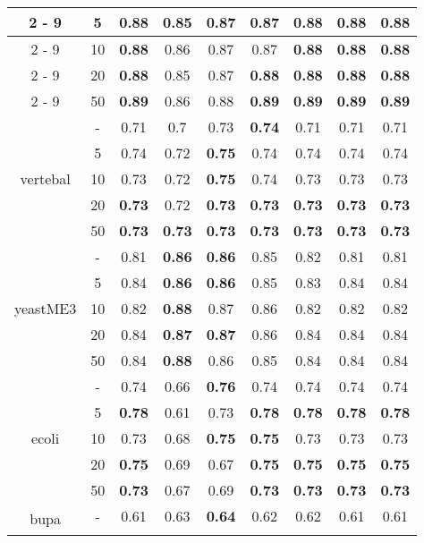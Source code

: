 \documentclass{article}%
\begin{document}
\begin{tabular}{c|c|ccccccc}
\cline{2%
-%
9}%
&5&\textbf{0.88}&0.85&0.87&0.87&\textbf{0.88}&\textbf{0.88}&\textbf{0.88}\\%
\cline{2%
-%
9}%
&10&\textbf{0.88}&0.86&0.87&0.87&\textbf{0.88}&\textbf{0.88}&\textbf{0.88}\\%
\cline{2%
-%
9}%
&20&\textbf{0.88}&0.85&0.87&\textbf{0.88}&\textbf{0.88}&\textbf{0.88}&\textbf{0.88}\\%
\cline{2%
-%
9}%
&50&\textbf{0.89}&0.86&0.88&\textbf{0.89}&\textbf{0.89}&\textbf{0.89}&\textbf{0.89}\\%
\hline%
\multirow{5}{*}{vertebal}&{-}&0.71&0.7&0.73&\textbf{0.74}&0.71&0.71&0.71\\%
\cline{2%
-%
9}%
&5&0.74&0.72&\textbf{0.75}&0.74&0.74&0.74&0.74\\%
\cline{2%
-%
9}%
&10&0.73&0.72&\textbf{0.75}&0.74&0.73&0.73&0.73\\%
\cline{2%
-%
9}%
&20&\textbf{0.73}&0.72&\textbf{0.73}&\textbf{0.73}&\textbf{0.73}&\textbf{0.73}&\textbf{0.73}\\%
\cline{2%
-%
9}%
&50&\textbf{0.73}&\textbf{0.73}&\textbf{0.73}&\textbf{0.73}&\textbf{0.73}&\textbf{0.73}&\textbf{0.73}\\%
\hline%
\multirow{5}{*}{yeastME3}&{-}&0.81&\textbf{0.86}&\textbf{0.86}&0.85&0.82&0.81&0.81\\%
\cline{2%
-%
9}%
&5&0.84&\textbf{0.86}&\textbf{0.86}&0.85&0.83&0.84&0.84\\%
\cline{2%
-%
9}%
&10&0.82&\textbf{0.88}&0.87&0.86&0.82&0.82&0.82\\%
\cline{2%
-%
9}%
&20&0.84&\textbf{0.87}&\textbf{0.87}&0.86&0.84&0.84&0.84\\%
\cline{2%
-%
9}%
&50&0.84&\textbf{0.88}&0.86&0.85&0.84&0.84&0.84\\%
\hline%
\multirow{5}{*}{ecoli}&{-}&0.74&0.66&\textbf{0.76}&0.74&0.74&0.74&0.74\\%
\cline{2%
-%
9}%
&5&\textbf{0.78}&0.61&0.73&\textbf{0.78}&\textbf{0.78}&\textbf{0.78}&\textbf{0.78}\\%
\cline{2%
-%
9}%
&10&0.73&0.68&\textbf{0.75}&\textbf{0.75}&0.73&0.73&0.73\\%
\cline{2%
-%
9}%
&20&\textbf{0.75}&0.69&0.67&\textbf{0.75}&\textbf{0.75}&\textbf{0.75}&\textbf{0.75}\\%
\cline{2%
-%
9}%
&50&\textbf{0.73}&0.67&0.69&\textbf{0.73}&\textbf{0.73}&\textbf{0.73}&\textbf{0.73}\\%
\hline%
\multirow{5}{*}{bupa}&{-}&0.61&0.63&\textbf{0.64}&0.62&0.62&0.61&0.61\\%
\cline{2%
-%
9}%

\end{tabular}
\end{document}
